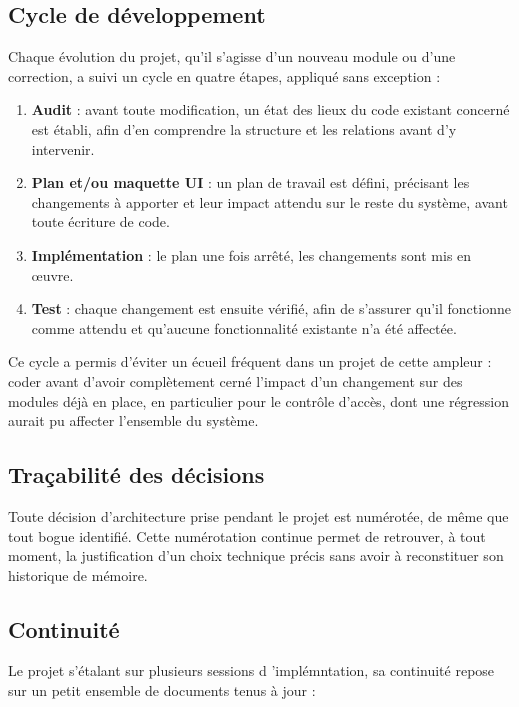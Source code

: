 \subsection{Cycle de développement}

Chaque évolution du projet, qu'il s'agisse d'un nouveau module ou d'une
correction, a suivi un cycle en quatre étapes, appliqué sans exception :

\begin{enumerate}
  \item \textbf{Audit} : avant toute modification, un état des lieux du
        code existant concerné est établi, afin d'en comprendre la structure et les relations avant d'y intervenir.
  \item \textbf{Plan et/ou maquette UI} : un plan de travail est défini, précisant les
        changements à apporter et leur impact attendu sur le reste du
        système, avant toute écriture de code.
  \item \textbf{Implémentation} : le plan une fois arrêté, les
        changements sont mis en œuvre.
  \item \textbf{Test} : chaque changement est ensuite vérifié, afin de
        s'assurer qu'il fonctionne comme attendu et qu'aucune
        fonctionnalité existante n'a été affectée.
\end{enumerate}

Ce cycle a permis d'éviter un écueil fréquent dans un projet de cette
ampleur : coder avant d'avoir complètement cerné l'impact d'un
changement sur des modules déjà en place, en particulier pour le
contrôle d'accès, dont une régression aurait pu affecter l'ensemble du
système.

\subsection{Traçabilité des décisions}

Toute décision d'architecture prise pendant le projet est numérotée, 
de même que tout bogue identifié. Cette numérotation continue permet de retrouver, à tout
moment, la justification d'un choix technique précis sans avoir à
reconstituer son historique de mémoire.

\subsection{Continuité}

Le projet s'étalant sur plusieurs sessions d 'implémntation, sa continuité repose sur un
petit ensemble de documents tenus à jour :

